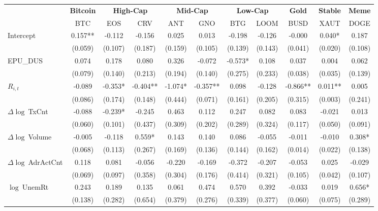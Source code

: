 \begin{table}[ht]
\centering
\scriptsize
\setlength{\tabcolsep}{4pt}
\begin{tabular}{l *{10}{c}}
\toprule
&\multicolumn{1}{c}{\textbf{Bitcoin}}&\multicolumn{2}{c}{\textbf{High-Cap}}&\multicolumn{2}{c}{\textbf{Mid-Cap}}&\multicolumn{2}{c}{\textbf{Low-Cap}}&\multicolumn{1}{c}{\textbf{Gold}}&\multicolumn{1}{c}{\textbf{Stable}}&\multicolumn{1}{c}{\textbf{Meme}}\\
\addlinespace
 & BTC & EOS & CRV & ANT & GNO & BTG & LOOM & BUSD & XAUT & DOGE \\
\midrule
Intercept & 0.157** & -0.112 & -0.156 & 0.025 & 0.013 & -0.198 & -0.126 & -0.000 & 0.040* & 0.187 \\
 & (0.059) & (0.107) & (0.187) & (0.159) & (0.105) & (0.139) & (0.143) & (0.041) & (0.020) & (0.108) \\
\addlinespace
EPU_DUS & 0.074 & 0.178 & 0.080 & 0.326 & -0.072 & -0.573* & 0.108 & 0.037 & 0.004 & 0.062 \\
 & (0.079) & (0.140) & (0.213) & (0.194) & (0.140) & (0.275) & (0.233) & (0.038) & (0.035) & (0.139) \\
\addlinespace
$R_{i,t}$ & -0.089 & -0.353* & -0.404** & -1.074* & -0.357** & 0.098 & -0.128 & -0.866** & 0.011** & 0.005 \\
 & (0.086) & (0.174) & (0.148) & (0.444) & (0.071) & (0.161) & (0.205) & (0.315) & (0.003) & (0.241) \\
\addlinespace
$\Delta\log\ $TxCnt & -0.088 & -0.239* & -0.245 & 0.463 & 0.112 & 0.247 & 0.082 & 0.083 & -0.021 & 0.013 \\
 & (0.060) & (0.101) & (0.437) & (0.309) & (0.202) & (0.289) & (0.324) & (0.117) & (0.050) & (0.091) \\
\addlinespace
$\Delta\log\ $Volume & -0.005 & -0.118 & 0.559* & 0.143 & 0.140 & 0.086 & -0.055 & -0.011 & -0.010 & 0.308* \\
 & (0.068) & (0.113) & (0.267) & (0.169) & (0.136) & (0.144) & (0.162) & (0.014) & (0.022) & (0.138) \\
\addlinespace
$\Delta\log\ $AdrActCnt & 0.118 & 0.081 & -0.056 & -0.220 & -0.169 & -0.372 & -0.207 & -0.053 & 0.025 & -0.029 \\
 & (0.069) & (0.097) & (0.358) & (0.304) & (0.176) & (0.414) & (0.321) & (0.105) & (0.042) & (0.107) \\
\addlinespace
$\log\ $UnemRt & 0.243 & 0.189 & 0.135 & 0.061 & 0.474 & 0.570 & 0.392 & -0.033 & 0.019 & 0.656* \\
 & (0.138) & (0.282) & (0.654) & (0.379) & (0.276) & (0.339) & (0.377) & (0.060) & (0.075) & (0.289) \\

\end{tabular}
\end{table}
